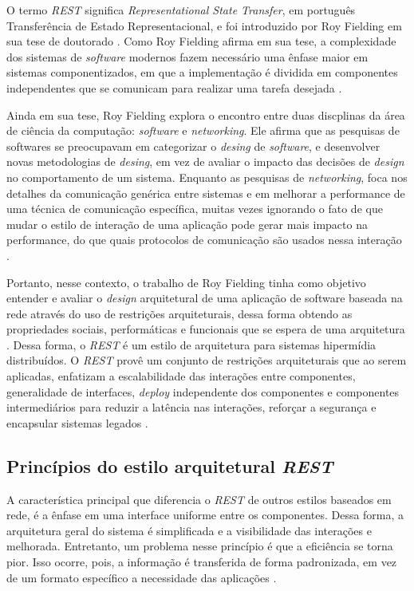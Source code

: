	O termo \textit{REST} significa \textit{Representational State Transfer}, em português Transferência de Estado Representacional, e foi introduzido por Roy Fielding em sua tese de doutorado \cite{fielding2000architectural}. Como Roy Fielding afirma em sua tese, a complexidade dos sistemas de \textit{software} modernos fazem necessário uma ênfase maior  em sistemas componentizados, em que a implementação é dividida em componentes independentes que se comunicam para realizar uma tarefa desejada \cite{fielding2000architectural}.
	
	Ainda em sua tese, Roy Fielding explora o encontro entre duas discplinas da área de ciência da computação: \textit{software} e \textit{networking}. Ele afirma que as pesquisas de softwares se preocupavam em categorizar o \textit{desing} de \textit{software}, e desenvolver novas metodologias de \textit{desing}, em vez de avaliar o impacto das decisões de \textit{design} no comportamento de um sistema. Enquanto as pesquisas de \textit{networking}, foca nos detalhes da comunicação genérica entre sistemas e em melhorar a performance de uma técnica de comunicação específica, muitas vezes ignorando o fato de que mudar o estilo de interação de uma aplicação pode gerar mais impacto na performance, do que quais protocolos de comunicação são usados nessa interação \cite{fielding2000architectural}.
	
	Portanto, nesse contexto, o trabalho de Roy Fielding tinha como objetivo entender e avaliar o \textit{design} arquitetural de uma aplicação de software baseada na rede através do uso de restrições arquiteturais, dessa forma obtendo as propriedades sociais, performáticas e funcionais que se espera de uma arquitetura \cite{fielding2000architectural}. Dessa forma, o \textit{REST} é um estilo de arquitetura para sistemas hipermídia distribuídos. O \textit{REST} provê um conjunto de restrições arquiteturais que ao serem aplicadas, enfatizam a escalabilidade das interações entre componentes, generalidade de interfaces, \textit{deploy} independente dos componentes e componentes intermediários para reduzir a latência nas interações, reforçar a segurança e encapsular sistemas legados \cite{fielding2000architectural}.
	
\subsection{Princípios do estilo arquitetural \textit{REST}}

	A característica principal que diferencia o \textit{REST} de outros estilos baseados em rede, é a ênfase em uma interface uniforme entre os componentes. Dessa forma, a arquitetura geral do sistema é simplificada e a visibilidade das interações e melhorada. Entretanto, um problema nesse princípio é que a eficiência se torna pior. Isso ocorre, pois, a informação é transferida de forma padronizada, em vez de um formato específico a necessidade das aplicações \cite{fielding2000architectural}.
	
